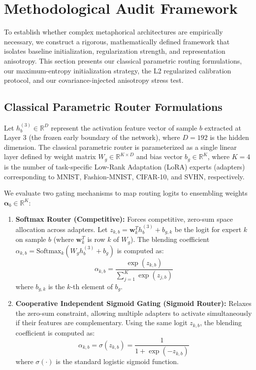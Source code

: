 \section{Methodological Audit Framework}
\label{sec:methodology}

To establish whether complex metaphorical architectures are empirically necessary, we construct a rigorous, mathematically defined framework that isolates baseline initialization, regularization strength, and representation anisotropy. This section presents our classical parametric routing formulations, our maximum-entropy initialization strategy, the L2 regularized calibration protocol, and our covariance-injected anisotropy stress test.

\subsection{Classical Parametric Router Formulations}
Let $h_b^{(3)} \in \mathbb{R}^D$ represent the activation feature vector of sample $b$ extracted at Layer 3 (the frozen early boundary of the network), where $D = 192$ is the hidden dimension. The classical parametric router is parameterized as a single linear layer defined by weight matrix $W_g \in \mathbb{R}^{K \times D}$ and bias vector $b_g \in \mathbb{R}^K$, where $K = 4$ is the number of task-specific Low-Rank Adaptation (LoRA) experts (adapters) corresponding to MNIST, Fashion-MNIST, CIFAR-10, and SVHN, respectively.

We evaluate two gating mechanisms to map routing logits to ensembling weights $\boldsymbol{\alpha}_b \in \mathbb{R}^K$:
\begin{enumerate}
    \item \textbf{Softmax Router (Competitive):} Forces competitive, zero-sum space allocation across adapters. Let $z_{k, b} = \mathbf{w}_k^T h_b^{(3)} + b_{g, k}$ be the logit for expert $k$ on sample $b$ (where $\mathbf{w}_k^T$ is row $k$ of $W_g$). The blending coefficient $\alpha_{k, b} = \text{Softmax}_k( W_g h_b^{(3)} + b_g )$ is computed as:
    \begin{equation}
        \alpha_{k, b} = \frac{\exp(z_{k, b})}{\sum_{j=1}^K \exp(z_{j, b})}
    \end{equation}
    where $b_{g, k}$ is the $k$-th element of $b_g$.
    \item \textbf{Cooperative Independent Sigmoid Gating (Sigmoid Router):} Relaxes the zero-sum constraint, allowing multiple adapters to activate simultaneously if their features are complementary. Using the same logit $z_{k, b}$, the blending coefficient is computed as:
    \begin{equation}
        \alpha_{k, b} = \sigma\left( z_{k, b} \right) = \frac{1}{1 + \exp\left( - z_{k, b} \right)}
    \end{equation}
    where $\sigma(\cdot)$ is the standard logistic sigmoid function.
\end{enumerate}

